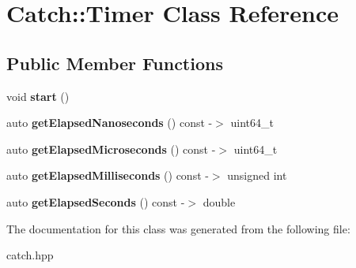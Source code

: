 \hypertarget{classCatch_1_1Timer}{}\section{Catch\+::Timer Class Reference}
\label{classCatch_1_1Timer}
\subsection*{Public Member Functions}
\begin{DoxyCompactItemize}
\item 
\mbox{\label{classCatch_1_1Timer_a0a56e879e43f36c102bf9ea8b5fc8b72}} 
void {\bfseries start} ()
\item 
\mbox{\label{classCatch_1_1Timer_a57be5d17ca868a2d6fb1eea84de665cf}} 
auto {\bfseries get\+Elapsed\+Nanoseconds} () const -\/$>$ uint64\+\_\+t
\item 
\mbox{\label{classCatch_1_1Timer_a545de17a61a6fee1dbe3de5b0723e5fa}} 
auto {\bfseries get\+Elapsed\+Microseconds} () const -\/$>$ uint64\+\_\+t
\item 
\mbox{\label{classCatch_1_1Timer_a30aaf458dbb59dd8ac8971c9c62e0eac}} 
auto {\bfseries get\+Elapsed\+Milliseconds} () const -\/$>$ unsigned int
\item 
\mbox{\label{classCatch_1_1Timer_a065e37e3c9eb16bd4dcf41971d8deedc}} 
auto {\bfseries get\+Elapsed\+Seconds} () const -\/$>$ double
\end{DoxyCompactItemize}


The documentation for this class was generated from the following file\+:\begin{DoxyCompactItemize}
\item 
catch.\+hpp\end{DoxyCompactItemize}
